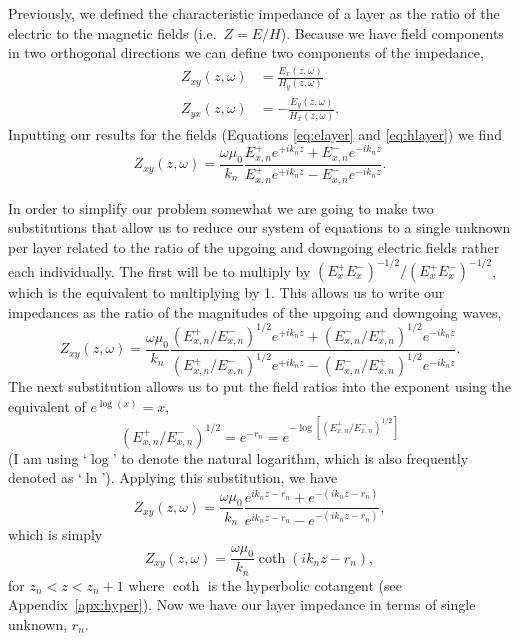 Previously, we defined the characteristic impedance of a layer as the ratio of
the electric to the magnetic fields (i.e.\ $Z = E/H$).  Because we have field
components in two orthogonal directions we can define two components of the
impedance,
\begin{align*}
    Z_{xy}(z,\omega) & = \frac{E_{x}(z,\omega)}{H_{y}(z,\omega)} \\
    Z_{yx}(z,\omega) & = -\frac{E_{y}(z,\omega)}{H_{x}(z,\omega)}.
\end{align*}
Inputting our results for the fields (Equations \ref{eq:elayer} and
\ref{eq:hlayer}) we find
\begin{equation*}
    Z_{xy}(z,\omega) = \frac{\omega \mu_0}{k_n}
        \frac{E^{+}_{x,n} e^{+i k_{n} z} + E^{-}_{x,n} e^{-i k_{n} z}}
        {E^{+}_{x,n} e^{+i k_{n} z} - E^{-}_{x,n} e^{-i k_{n} z}}.
\end{equation*}

In order to simplify our problem somewhat we are going to make two substitutions
that allow us to reduce our system of equations to a single unknown per layer
related to the ratio of the upgoing and downgoing electric fields rather each
individually.   The first will be to multiply by $(E_x^+ E_x^-)^{-1/2}/(E_x^+
E_x^-)^{-1/2}$, which is the equivalent to multiplying by 1.  This allows us to
write our impedances as the ratio of the magnitudes of the upgoing and downgoing
waves,
\begin{equation*}
    Z_{xy}(z,\omega) = \frac{\omega \mu_0}{k_n}
        \frac{(E^{+}_{x,n}/E^{-}_{x,n})^{1/2} e^{+i k_{n} z} 
            + (E^{-}_{x,n}/E^{+}_{x,n})^{1/2} e^{-i k_{n} z}}
        {(E^{+}_{x,n}/E^{-}_{x,n})^{1/2} e^{+i k_{n} z} 
            - (E^{-}_{x,n}/E^{+}_{x,n})^{1/2} e^{-i k_{n} z}}.
\end{equation*}
The next substitution allows us to put the field ratios into the exponent using
the equivalent of $e^{\log(x)} = x$,
\begin{equation*}
    (E^{+}_{x,n}/E^{-}_{x,n})^{1/2} = e^{-r_n} =
    e^{-\log[(E^{+}_{x,n}/E^{-}_{x,n})^{1/2}]}
\end{equation*}
(I am using `$\log$' to denote the natural logarithm, which is also frequently
denoted as `$\ln$').  Applying this substitution, we have
\begin{equation*}
    Z_{xy}(z,\omega) = \frac{\omega \mu_0}{k_{n}}
        \frac{e^{i k_n z - r_n} + e^{-(i k_n z - r_n)}}
        {e^{i k_n z - r_n} - e^{-(i k_n z - r_n)}},
\end{equation*}
which is simply
\begin{equation}
    Z_{xy}(z,\omega) = \frac{\omega \mu_0}{k_{n}} \coth (i k_n z - r_n),
    \label{eq:Zn}
\end{equation}
for $z_{n} < z < z_n+1$ where $\coth$ is the hyperbolic cotangent (see
Appendix~\ref{apx:hyper}).  Now we have our layer impedance in terms of single
unknown, $r_{n}$.

